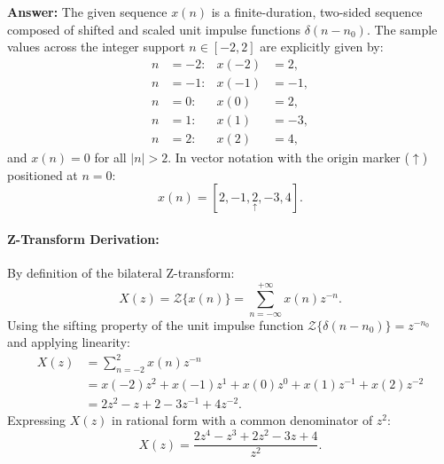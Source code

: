 \documentclass[12pt,a4paper]{article}
\newcommand{\org}[1]{\underset{\uparrow}{#1}}
\begin{document}
\noindent\textbf{Answer:}
The given sequence $x(n)$ is a finite-duration, two-sided sequence composed of shifted and scaled unit impulse functions $\delta(n - n_0)$. The sample values across the integer support $n \in [-2, 2]$ are explicitly given by:
\begin{align*}
    n &= -2: & x(-2) &= 2, \\
    n &= -1: & x(-1) &= -1, \\
    n &= 0:  & x(0)  &= 2, \\
    n &= 1:  & x(1)  &= -3, \\
    n &= 2:  & x(2)  &= 4,
\end{align*}
and $x(n) = 0$ for all $|n| > 2$. In vector notation with the origin marker ($\uparrow$) positioned at $n = 0$:
\[
x(n) = [2, -1, \org{2}, -3, 4].
\]

\paragraph{Z-Transform Derivation:}
By definition of the bilateral Z-transform:
\begin{equation*}
    X(z) = \mathcal{Z}\{x(n)\} = \sum_{n=-\infty}^{+\infty} x(n) z^{-n}.
\end{equation*}
Using the sifting property of the unit impulse function $\mathcal{Z}\{\delta(n - n_0)\} = z^{-n_0}$ and applying linearity:
\begin{align*}
    X(z) &= \sum_{n=-2}^{2} x(n) z^{-n} \\
    &= x(-2)z^2 + x(-1)z^1 + x(0)z^0 + x(1)z^{-1} + x(2)z^{-2} \\
    &= 2z^2 - z + 2 - 3z^{-1} + 4z^{-2}.
\end{align*}
Expressing $X(z)$ in rational form with a common denominator of $z^2$:
\begin{equation}
    X(z) = \frac{2z^4 - z^3 + 2z^2 - 3z + 4}{z^2}.
    \label{eq:ex1_xz}
\end{equation}
\end{document}
